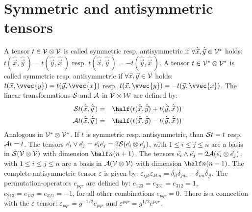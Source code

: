 \section{Symmetric and antisymmetric tensors}
A tensor $t\in{\cal V\otimes V}$ is called symmetric resp. antisymmetric if
$\forall\hat{\vec{x}},\hat{\vec{y}}\in{\cal V^*}$ holds:
$t(\hat{\vec{x}},\hat{\vec{y}}\,)=t(\hat{\vec{y}},\hat{\vec{x}}\,)$ resp.
$t(\hat{\vec{x}},\hat{\vec{y}}\,)=-t(\hat{\vec{y}},\hat{\vec{x}}\,)$.
\npar
A tensor $t\in{\cal V^*\otimes V^*}$ is called symmetric resp. antisymmetric
if $\forall\vec{x},\vec{y}\in{\cal V}$ holds:
$t(\vec{x},\vvec{y})=t(\vec{y},\vvec{x})$ resp.
$t(\vec{x},\vvec{y})=-t(\vec{y},\vvec{x})$. The linear transformations
$\cal S$ and $\cal A$ in $\cal V\otimes W$ are defined by:
\begin{eqnarray*}
{\cal S}t(\hat{\vec{x}},\hat{\vec{y}}\,)&=&\half(t(\hat{\vec{x}},\hat{\vec{y}})+t(\hat{\vec{y}},\hat{\vec{x}}\,))\\
{\cal A}t(\hat{\vec{x}},\hat{\vec{y}}\,)&=&\half(t(\hat{\vec{x}},\hat{\vec{y}})-t(\hat{\vec{y}},\hat{\vec{x}}\,))
\end{eqnarray*}
Analogous in $\cal V^*\otimes V^*$. If $t$ is symmetric resp. antisymmetric,
than ${\cal S}t=t$ resp. ${\cal A}t=t$.
\npar
The tensors $\vec{e}_i\vee\vec{e}_j=\vec{e}_i\vec{e}_j=2{\cal S}(\vec{e}_i\otimes\vec{e}_j)$,
with $1\leq i\leq j\leq n$ are a basis in $\cal S(V\otimes V)$ with dimension
$\half n(n+1)$.
\npar
The tensors $\vec{e}_i\wedge\vec{e}_j=2{\cal A}(\vec{e}_i\otimes\vec{e}_j)$,
with $1\leq i\leq j\leq n$ are a basis in $\cal A(V\otimes V)$ with dimension
$\half n(n-1)$.
\npar
The complete antisymmetric tensor $\varepsilon$ is given by:
$\varepsilon_{ijk}\varepsilon_{klm}=\delta_{il}\delta_{jm}-\delta_{im}\delta_{jl}$.
\npar
The permutation-operators $e_{pqr}$ are defined by:
$e_{123}=e_{231}=e_{312}=1$, $e_{213}=e_{132}=e_{321}=-1$, for all other
combinations $e_{pqr}=0$. There is a connection with the $\varepsilon$ tensor:
$\varepsilon_{pqr}=g^{-1/2}e_{pqr}$ and $\varepsilon^{pqr}=g^{1/2}e^{pqr}$.

